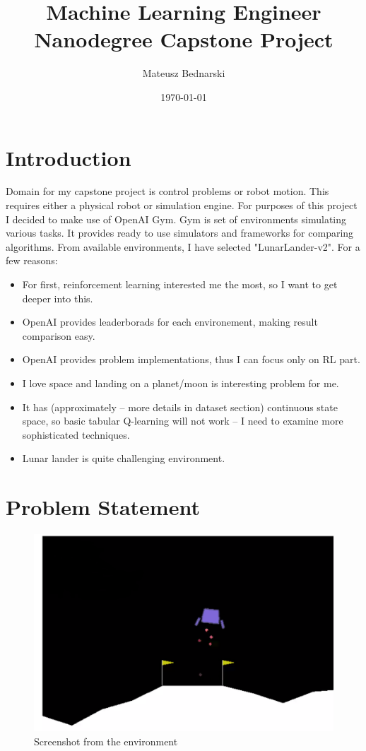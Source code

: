 \documentclass[12pt]{article}
\title{Machine Learning Engineer Nanodegree Capstone Project}
\author{Mateusz Bednarski}
\date{\today}
\begin{document}
\maketitle



\section{Introduction}

Domain for my capstone project is control problems or robot motion. This requires either a physical robot or simulation engine. For purposes of this project I decided to make use of OpenAI Gym\cite{GYM}. Gym is set of environments simulating various tasks. It provides ready to use simulators and frameworks for comparing algorithms. From available environments, I have selected "LunarLander-v2"\cite{lunarlander}. For a few reasons:
\begin{itemize}
\item For first, reinforcement learning interested me the most, so I want to get deeper into this.
\item OpenAI provides leaderborads for each environement, making result comparison easy.
\item OpenAI provides problem implementations, thus I can focus only on RL part.
\item I love space and landing on a planet/moon is interesting problem for me.
\item It has (approximately – more details in dataset section) continuous state space, so basic tabular Q-learning will not work – I need to examine more sophisticated techniques.
\item Lunar lander is quite challenging environment.
\end{itemize}

\section{Problem Statement}

\begin{figure}[h]
\centering
\includegraphics[scale=0.3]{lunar.png} 
\caption{Screenshot from the environment}
\end{figure}
\end{document}
